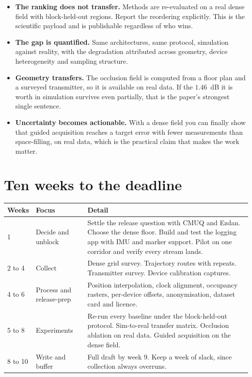 \documentclass[11pt,a4paper]{article}
\begin{document}
\begin{itemize}
\item \textbf{The ranking does not transfer.} Methods are re-evaluated on a real dense
field with block-held-out regions. Report the reordering explicitly. This is the
scientific payload and is publishable regardless of who wins.
\item \textbf{The gap is quantified.} Same architectures, same protocol, simulation
against reality, with the degradation attributed across geometry, device heterogeneity
and sampling structure.
\item \textbf{Geometry transfers.} The occlusion field is computed from a floor plan and
a surveyed transmitter, so it is available on real data. If the $1.46$~dB it is worth in
simulation survives even partially, that is the paper's strongest single sentence.
\item \textbf{Uncertainty becomes actionable.} With a dense field you can finally show
that guided acquisition reaches a target error with fewer measurements than
space-filling, on real data, which is the practical claim that makes the work matter.
\end{itemize}

\section{Ten weeks to the deadline}

\begin{center}
\small
\begin{tabular}{llp{9.2cm}}
\toprule
Weeks & Focus & Detail \\
\midrule
1 & Decide and unblock & Settle the release question with CMUQ and Ezdan. Choose the
dense floor. Build and test the logging app with IMU and marker support. Pilot on one
corridor and verify every stream lands. \\
2 to 4 & Collect & Dense grid survey. Trajectory routes with repeats. Transmitter survey.
Device calibration captures. \\
4 to 6 & Process and release-prep & Position interpolation, clock alignment, occupancy
rasters, per-device offsets, anonymisation, dataset card and licence. \\
5 to 8 & Experiments & Re-run every baseline under the block-held-out protocol. Sim-to-real
transfer matrix. Occlusion ablation on real data. Guided acquisition on the dense field. \\
8 to 10 & Write and buffer & Full draft by week 9. Keep a week of slack, since collection
always overruns. \\
\bottomrule
\end{tabular}
\end{center}
\end{document}

